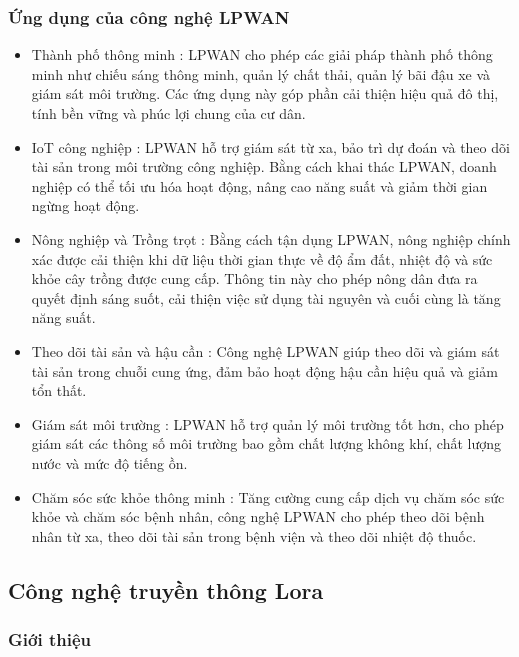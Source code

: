\documentclass{article} %
\begin{document}
	
	\subsubsection{Ứng dụng của công nghệ LPWAN}
	\begin{itemize}
		\item Thành phố thông minh : LPWAN cho phép các giải pháp thành phố thông minh như chiếu sáng thông minh, quản lý chất thải, quản lý bãi đậu xe và giám sát môi trường. Các ứng dụng này góp phần cải thiện hiệu quả đô thị, tính bền vững và phúc lợi chung của cư dân.
		
		\item IoT công nghiệp : LPWAN hỗ trợ giám sát từ xa, bảo trì dự đoán và theo dõi tài sản trong môi trường công nghiệp. Bằng cách khai thác LPWAN, doanh nghiệp có thể tối ưu hóa hoạt động, nâng cao năng suất và giảm thời gian ngừng hoạt động.
		
		\item Nông nghiệp và Trồng trọt : Bằng cách tận dụng LPWAN, nông nghiệp chính xác được cải thiện khi dữ liệu thời gian thực về độ ẩm đất, nhiệt độ và sức khỏe cây trồng được cung cấp. Thông tin này cho phép nông dân đưa ra quyết định sáng suốt, cải thiện việc sử dụng tài nguyên và cuối cùng là tăng năng suất.
		
		\item Theo dõi tài sản và hậu cần : Công nghệ LPWAN giúp theo dõi và giám sát tài sản trong chuỗi cung ứng, đảm bảo hoạt động hậu cần hiệu quả và giảm tổn thất.
		
		\item Giám sát môi trường : LPWAN hỗ trợ quản lý môi trường tốt hơn, cho phép giám sát các thông số môi trường bao gồm chất lượng không khí, chất lượng nước và mức độ tiếng ồn.
		\item Chăm sóc sức khỏe thông minh : Tăng cường cung cấp dịch vụ chăm sóc sức khỏe và chăm sóc bệnh nhân, công nghệ LPWAN cho phép theo dõi bệnh nhân từ xa, theo dõi tài sản trong bệnh viện và theo dõi nhiệt độ thuốc.
		
	\end{itemize}
	
	
	
	\subsection{Công nghệ truyền thông Lora}
	\subsubsection{Giới thiệu}
	
\end{document}
